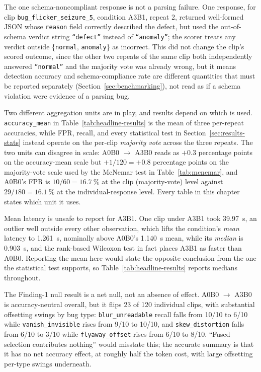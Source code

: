 The one schema-noncompliant response is not a parsing failure. One response, for clip \texttt{bug\_flicker\_seizure\_5}, condition A3B1, repeat 2, returned well-formed JSON whose \texttt{reason} field correctly described the defect, but used the out-of-schema verdict string \texttt{``defect''} instead of \texttt{``anomaly''}; the scorer treats any verdict outside \{\texttt{normal}, \texttt{anomaly}\} as incorrect. This did not change the clip's scored outcome, since the other two repeats of the same clip both independently answered \texttt{``normal''} and the majority vote was already wrong, but it means detection accuracy and schema-compliance rate are different quantities that must be reported separately (Section~\ref{sec:benchmarking}), not read as if a schema violation were evidence of a parsing bug.

Two different aggregation units are in play, and results depend on which is used. \texttt{accuracy\_mean} in Table~\ref{tab:headline-results} is the mean of three per-repeat accuracies, while FPR, recall, and every statistical test in Section~\ref{sec:results-stats} instead operate on the per-clip \emph{majority vote} across the three repeats. The two units can disagree in scale: A0B0 $\to$ A3B0 reads as $+0.3$ percentage points on the accuracy-mean scale but $+1/120 = +0.8$ percentage points on the majority-vote scale used by the McNemar test in Table~\ref{tab:mcnemar}, and A0B0's FPR is $10/60=\SI{16.7}{\percent}$ at the clip (majority-vote) level against $29/180=\SI{16.1}{\percent}$ at the individual-response level. Every table in this chapter states which unit it uses.

Mean latency is unsafe to report for A3B1. One clip under A3B1 took \SI{39.97}{\second}, an outlier well outside every other observation, which lifts the condition's \emph{mean} latency to \SI{1.261}{\second}, nominally above A0B0's \SI{1.140}{\second} mean, while its \emph{median} is \SI{0.903}{\second}, and the rank-based Wilcoxon test in fact places A3B1 as faster than A0B0. Reporting the mean here would state the opposite conclusion from the one the statistical test supports, so Table~\ref{tab:headline-results} reports medians throughout.

The Finding-1 null result is a net null, not an absence of effect. A0B0 $\to$ A3B0 is accuracy-neutral overall, but it flips 23 of 120 individual clips, with substantial offsetting swings by bug type: \texttt{blur\_unreadable} recall falls from 10/10 to 6/10 while \texttt{vanish\_invisible} rises from 9/10 to 10/10, and \texttt{skew\_distortion} falls from 6/10 to 3/10 while \texttt{flyaway\_offset} rises from 6/10 to 8/10. ``Fused selection contributes nothing'' would misstate this; the accurate summary is that it has no net accuracy effect, at roughly half the token cost, with large offsetting per-type swings underneath.

